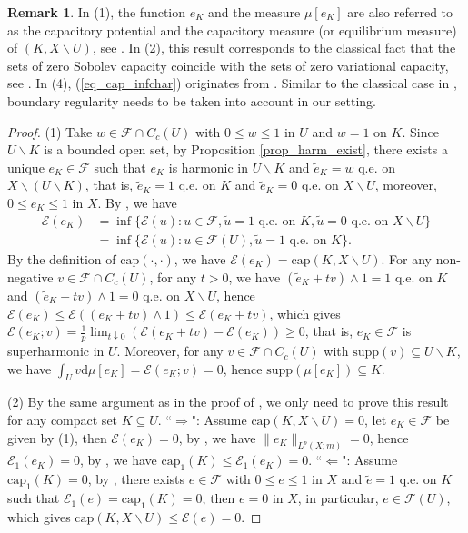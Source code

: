 \documentclass[11pt,a4paper]{article}
\numberwithin{equation}{section}
\theoremstyle{plain}
\theoremstyle{definition}
\newtheorem{remark}[theorem]{Remark}
\begin{document}
\begin{remark}
In (1), the function $e_K$ and the measure $\mu[e_K]$ are also referred to as the capacitory potential and the capacitory measure (or equilibrium measure) of $(K,X\backslash U)$, see \cite[Section 6]{GH14}. In (2), this result corresponds to the classical fact that the sets of zero Sobolev capacity coincide with the sets of zero variational capacity, see \cite[Lemma 6.15]{BB11}. In (4), (\ref{eq_cap_infchar}) originates from \cite[(4.19)]{TW02AJM}. Similar to the classical case in \cite{TW02AJM}, boundary regularity needs to be taken into account in our setting.
\end{remark}

\begin{proof}
(1) Take $w\in\mathcal{F}\cap C_c(U)$ with $0\le w\le 1$ in $U$ and $w=1$ on $K$. Since $U\backslash K$ is a bounded open set, by Proposition \ref{prop_harm_exist}, there exists a unique $e_K\in\mathcal{F}$ such that $e_K$ is harmonic in $U\backslash K$ and $\widetilde{e}_K={w}$ q.e. on $X\backslash(U\backslash K)$, that is, $\widetilde{e}_K=1$ q.e. on $K$ and $\widetilde{e}_K=0$ q.e. on $X\backslash U$, moreover, $0\le e_K\le 1$ in $X$. By \cite[Lemma 3.2]{Yan25c}, we have
\begin{align*}
\mathcal{E}(e_K)&=\inf\{\mathcal{E}(u):u\in\mathcal{F},\widetilde{u}=1\text{ q.e. on }K,\widetilde{u}=0\text{ q.e. on }X\backslash U\}\\
&=\inf\{\mathcal{E}(u):u\in\mathcal{F}(U),\widetilde{u}=1\text{ q.e. on }K\}.
\end{align*}
By the definition of $\mathrm{cap}(\cdot,\cdot)$, we have $\mathcal{E}(e_K)=\mathrm{cap}(K,X\backslash U)$. For any non-negative $v\in\mathcal{F}\cap C_c(U)$, for any $t>0$, we have $(\widetilde{e}_K+tv)\wedge 1=1$ q.e. on $K$ and $(\widetilde{e}_K+tv)\wedge 1=0$ q.e. on $X\backslash U$, hence $\mathcal{E}(e_K)\le\mathcal{E}((e_K+tv)\wedge1)\le\mathcal{E}(e_K+tv)$, which gives $\mathcal{E}(e_K;v)=\frac{1}{p}\lim_{t\downarrow0}\left(\mathcal{E}(e_K+tv)-\mathcal{E}(e_K)\right)\ge0$, that is, $e_K\in\mathcal{F}$ is superharmonic in $U$. Moreover, for any $v\in\mathcal{F}\cap C_c(U)$ with $\mathrm{supp}(v)\subseteq U\backslash K$, we have $\int_Uv\mathrm{d}\mu[e_K]=\mathcal{E}(e_K;v)=0$, hence $\mathrm{supp}(\mu[e_K])\subseteq K$.

(2) By the same argument as in the proof of \cite[Lemma 8.3]{Yan25a}, we only need to prove this result for any compact set $K\subseteq U$. ``$\Rightarrow$": Assume $\mathrm{cap}(K,X\backslash U)=0$, let $e_K\in\mathcal{F}$ be given by (1), then $\mathcal{E}(e_K)=0$, by \cite[Lemma 4.1]{Yan25c}, we have $\lVert {e_K}\rVert_{L^p(X;m)}=0$, hence $\mathcal{E}_1(e_K)=0$, by \cite[Lemma 8.8]{Yan25a}, we have $\mathrm{cap}_1(K)\le\mathcal{E}_1(e_K)=0$. ``$\Leftarrow$": Assume $\mathrm{cap}_1(K)=0$, by \cite[Lemma 8.8]{Yan25a}, there exists $e\in\mathcal{F}$ with $0\le e\le1$ in $X$ and $\widetilde{e}=1$ q.e. on $K$ such that $\mathcal{E}_1(e)=\mathrm{cap}_1(K)=0$, then $e=0$ in $X$, in particular, $e\in\mathcal{F}(U)$, which gives $\mathrm{cap}(K,X\backslash U)\le\mathcal{E}(e)=0$.


\end{proof}
\end{document}
